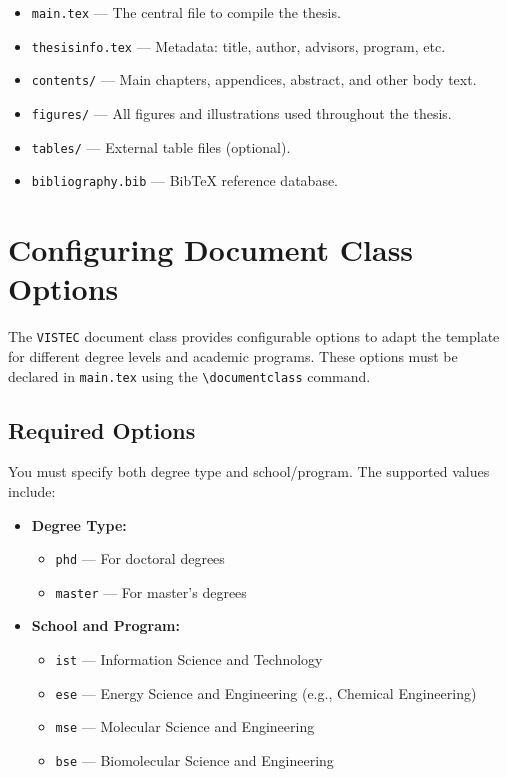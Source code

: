 \begin{itemize}[leftmargin=\paritemindent]
    \item \texttt{main.tex} — The central file to compile the thesis.
    \item \texttt{thesisinfo.tex} — Metadata: title, author, advisors, program, etc.
    \item \texttt{contents/} — Main chapters, appendices, abstract, and other body text.
    \item \texttt{figures/} — All figures and illustrations used throughout the thesis.
    \item \texttt{tables/} — External table files (optional).
    \item \texttt{bibliography.bib} — BibTeX reference database.
\end{itemize}

\section{Configuring Document Class Options}
\label{ch3:class-options}

\begin{paragraph}
The \texttt{VISTEC} document class provides configurable options to adapt the template for different degree levels and academic programs. These options must be declared in \texttt{main.tex} using the \verb|\documentclass| command.
\end{paragraph}

\subsection{Required Options}
\label{ch3:class-required}

\begin{subparagraph}
You must specify both degree type and school/program. The supported values include:
\end{subparagraph}

\begin{itemize}[leftmargin=\subparitemindent]
  \item \textbf{Degree Type:}
  \begin{itemize}[leftmargin=1em]
    \item \texttt{phd} — For doctoral degrees
    \item \texttt{master} — For master's degrees
  \end{itemize}
  \item \textbf{School and Program:}
  \begin{itemize}[leftmargin=1em]
    \item \texttt{ist} — Information Science and Technology
    \item \texttt{ese} — Energy Science and Engineering (e.g., Chemical Engineering)
    \item \texttt{mse} — Molecular Science and Engineering
    \item \texttt{bse} — Biomolecular Science and Engineering
  \end{itemize}
\end{itemize}

